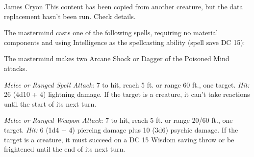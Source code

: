 \documentclass[10pt,a4paper,twoside,bg=print,twocolumn,openany,nodeprecatedcode]{dndbook}
\begin{document}
\begin{DndMonster}[float=t]{James Cryon}
\DndMonsterBasics[
armor-class = {12},
hit-points = {\DndDice{15d8 + 15}},
speed = {30 ft.}
]
\DndMonsterAbilityScores[
 str = 10,
 dex = 14,
 con = 13,
 int = 18,
 wis = 16,
 cha = 14
]
\DndMonsterDetails[
saving-throws = {Int +7, Wis +6},
skills = {Arcana +7, History +7, Insight +6, Perception +6},
languages = {Common plus three other languages},
challenge = 5,
]
This content has been copied from another creature, but the data replacement hasn't been run. Check details.

The mastermind casts one of the following spells, requiring no material components and using Intelligence as the spellcasting ability (spell save DC 15):
\begin{DndMonsterSpells}
\end{DndMonsterSpells}
The mastermind makes two Arcane Shock or Dagger of the Poisoned Mind attacks.

\textsl{Melee or Ranged Spell Attack:} 7 to hit, reach 5 ft. or range 60 ft., one target. \textsl{Hit:} 26 (4d10 + 4) lightning damage. If the target is a creature, it can't take reactions until the start of its next turn.

\textsl{Melee or Ranged Weapon Attack:} 7 to hit, reach 5 ft. or range 20/60 ft., one target. \textsl{Hit:} 6 (1d4 + 4) piercing damage plus 10 (3d6) psychic damage. If the target is a creature, it must succeed on a DC 15 Wisdom saving throw or be frightened until the end of its next turn.

\end{DndMonster}
\end{document}
